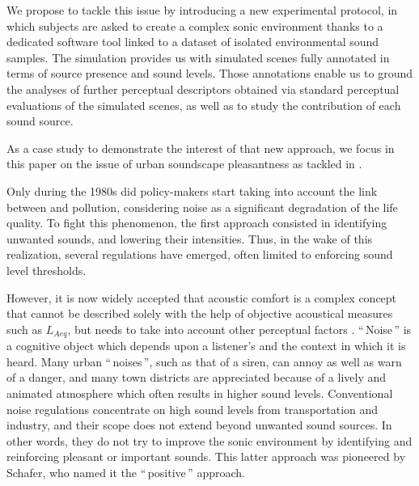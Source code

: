 \documentclass[twoside,twocolumn]{article}
\begin{document}
We propose to tackle this issue by introducing a new experimental protocol, in which subjects are asked to create a complex sonic environment thanks to a dedicated software tool linked to a dataset of isolated environmental sound samples. The simulation provides us with simulated scenes fully annotated in terms of source presence and sound levels. Those annotations enable us to ground the analyses of further perceptual descriptors obtained via standard perceptual evaluations of the simulated scenes, as well as to study the contribution of each sound source.

As a case study to demonstrate the interest of that new approach, we focus in this paper on the issue of urban soundscape pleasantness as tackled in \cite{guastavino_ideal_2006} .

Only during the 1980s did policy-makers start taking into account the link between  and pollution, considering noise as a significant degradation of the life quality. To fight this phenomenon, the first approach consisted in identifying unwanted sounds, and lowering their intensities. Thus, in the wake of this realization, several regulations have emerged, often limited to enforcing sound level thresholds. 

However, it is now widely accepted that acoustic comfort is a complex concept that cannot be described solely with the help of objective acoustical measures such as $L_{Aeq}$, but needs to take into account other perceptual factors \cite{schulte-fortkamp_soundscape_2006, aletta2016soundscape, Yang2005211, kang_semantic_2010}. ``\,Noise\,''  is a cognitive object which depends upon a listener's  and the context in which it is heard. Many urban ``\,noises\,'', such as that of a siren, can annoy as well as warn of a danger, and many town districts are appreciated because of a lively and animated atmosphere which often results in higher sound levels. Conventional noise regulations concentrate on high sound levels from transportation and industry, and their scope does not extend beyond unwanted sound sources. In other words, they do not try to improve the sonic environment by identifying and reinforcing pleasant or important sounds. This latter approach was pioneered by Schafer, who named it the ``\,positive\,'' approach. 
\end{document}
